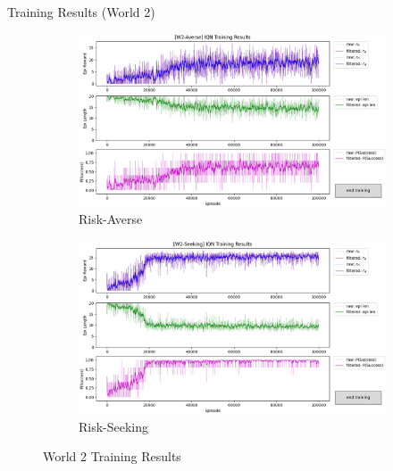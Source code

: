 \documentclass[aspectratio=1610, xcolor=dvipsnames]{packages/beamer}
\begin{document}
\begin{frame}{Training Results (World 2)}
     \begin{figure}
     \centering
         \begin{subfigure}[b]{\Wfig\textwidth} \centering
             \includegraphics[width=\textwidth]{../results/IDQN_W2/Fig_W2_JointQ_Averse}
             \caption{Risk-Averse} \label{fig:W2averse}
         \end{subfigure}
         \hfill
         \begin{subfigure}[b]{\Wfig\textwidth} \centering
             \includegraphics[width=\textwidth]{../results/IDQN_W2/Fig_W2_JointQ_Seeking}
             \caption{Risk-Seeking} \label{fig:W2seeking}
         \end{subfigure}
    \caption{World 2 Training Results}
    \label{fig:W2}
    \end{figure}
\end{frame}
\end{document}
